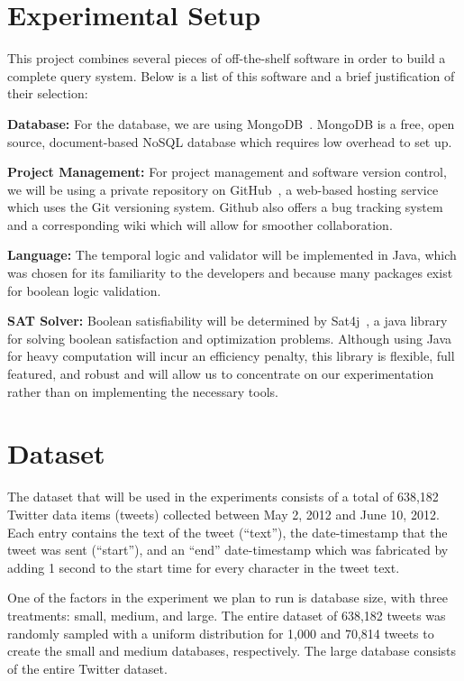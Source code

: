 \documentclass[10pt, journal]{IEEEtran}
\begin{document}
\section{Experimental Setup}
This project combines several pieces of off-the-shelf software in order to build a complete query system.  Below is a list of this software and a brief justification of their selection:

\textbf{Database:} For the database, we are using MongoDB~\cite{10gen:2013}. MongoDB is a free, open source, document-based NoSQL database which requires low overhead to set up. 

\textbf{Project Management:} For project management and software version control, we will be using a private repository on GitHub~\cite{GitHub:2013}, a web-based hosting service which uses the Git versioning system. Github also offers a bug tracking system and a corresponding wiki which will allow for smoother collaboration. 

\textbf{Language:} The temporal logic and validator will be implemented in Java, which was chosen for its familiarity to the developers and because many packages exist for boolean logic validation. 

\textbf{SAT Solver:}  Boolean satisfiability will be determined by Sat4j~\cite{Een:2003}, a java library for solving boolean satisfaction and optimization problems.  Although using Java for heavy computation will incur an efficiency penalty, this library is flexible, full featured, and robust and will allow us to concentrate on our experimentation rather than on implementing the necessary tools.  

\section{Dataset}
The dataset that will be used in the experiments consists of a total of 638,182 Twitter data items (tweets) collected between May 2, 2012 and June 10, 2012. Each entry contains the text of the tweet (``text''), the date-timestamp that the tweet was sent (``start''), and an ``end'' date-timestamp which was fabricated by adding 1 second to the start time for every character in the tweet text.

One of the factors in the experiment we plan to run is database size, with three treatments: small, medium, and large. The entire dataset of 638,182 tweets was randomly sampled with a uniform distribution for 1,000 and 70,814 tweets to create the small and medium databases, respectively. The large database consists of the entire Twitter dataset. 
\end{document}
